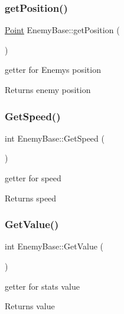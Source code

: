 \subsubsection{\texorpdfstring{get\+Position()}{getPosition()}}
{\footnotesize\ttfamily \mbox{\hyperlink{class_point}{Point}} Enemy\+Base\+::get\+Position (\begin{DoxyParamCaption}{ }\end{DoxyParamCaption})}



getter for Enemy\textquotesingle{}s position 

\begin{DoxyReturn}{Returns}
enemy position 
\end{DoxyReturn}
\mbox{\label{class_enemy_base_a4ab9a0cedd83a58215f37eb9e3eb9469}} 
\subsubsection{\texorpdfstring{Get\+Speed()}{GetSpeed()}}
{\footnotesize\ttfamily int Enemy\+Base\+::\+Get\+Speed (\begin{DoxyParamCaption}{ }\end{DoxyParamCaption})}



getter for speed 

\begin{DoxyReturn}{Returns}
speed 
\end{DoxyReturn}
\mbox{\label{class_enemy_base_a7187da0f23cc619b9ebca37d9adb9b96}} 
\subsubsection{\texorpdfstring{Get\+Value()}{GetValue()}}
{\footnotesize\ttfamily int Enemy\+Base\+::\+Get\+Value (\begin{DoxyParamCaption}{ }\end{DoxyParamCaption})}



getter for stats value 

\begin{DoxyReturn}{Returns}
value 
\end{DoxyReturn}
\mbox{\label{class_enemy_base_aeae4a4336e40f2f799fafaef9e21f61b}} 
